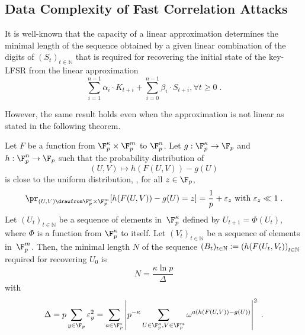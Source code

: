    


\subsection{Data Complexity of Fast Correlation Attacks}
\label{sec:fast-correlation-data}

It is well-known that the capacity of a linear approximation determines the minimal length of the sequence obtained by a given linear combination of the digits of \((S_t)_{t \in \mathbb{N}}\) that is required for recovering the initial state of the key-LFSR from the linear approximation
\[\sum_{i=1}^{n-1} \alpha_i \cdot K_{t+i} + \sum_{i=0}^{n-1} \beta_i \cdot S_{t+i}, \forall t \geq 0\;.\]

However, the same result holds even when the approximation is not linear as stated in the following theorem.
\begin{theorem}\label{th:Nmin}
  Let  \(F\) be a function from \(\F_p^\kappa \times \F_p^m\) to \(\F_p^n\). Let \(g:\F_p^\kappa \rightarrow \F_p\) and \(h: \F_p^n \rightarrow \F_p\) such that the probability distribution of
  \[(U,V) \mapsto h(F(U,V)) - g(U)\]
  is close to the uniform distribution, \ie, for all \(z \in \F_p\),
  \[\pr_{(U,V) \drawfrom \F_p^\kappa \times \F_p^m}[h(F(U,V)) - g(U)=z] = \frac{1}{p} + \varepsilon_z \mbox{ with } \varepsilon_z\ll 1\;.\]
  Let \((U_t)_{t \in \mathbb{N}}\) be a sequence of elements in~\(\F_p^\kappa\) defined by \(U_{t+1} = \Phi(U_t)\), where  $\Phi$ is a function from $\F_p^\kappa$ to itself. Let \((V_t)_{t \in \mathbb{N}}\) be a sequence of elements in~\(\F_p^m\).
  Then, the minimal length \(N\) of the sequence \( (B_{t})_{t \in \mathbb{N}} \vcentcolon= \left( h(F(U_t,V_t) \right)_{t \in \mathbb{N}}\) 
    required for recovering \(U_0\) is
  \[N = \frac{\kappa \ln p}{\Delta}\]
  with \[\Delta = p \sum_{y \in \F_p} \varepsilon_y^2 = \sum_{a \in \F_p^*} \left|p^{-\kappa} \sum_{U \in \F_p^\kappa,V\in \F_p^m}\omega^{a(h(F(U,V)) - g(U))}\right|^2\;.\]
\end{theorem}
